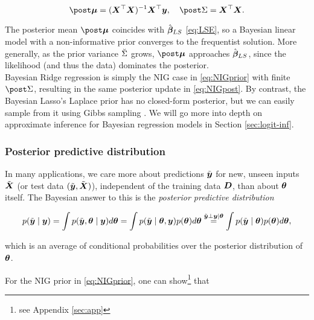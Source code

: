 \begin{equation*}
        \mupo = (\bX^\top \bX)^{-1} \bX^\top \by, \quad
        \Sdpo = \bX^\top \bX.
\end{equation*}

The posterior mean $\mupo$ coincides with $\hat{\bm{\beta}}_{LS}$ \eqref{eq:LSE}, so a Bayesian linear model with a non-informative prior converges to the frequentist solution.
More generally, as the prior variance $\breve{\Sigma}$ grows, $\mupo$ approaches $\hat{\bm{\beta}}_{LS}$, since the likelihood (and thus the data) dominates the posterior.\\

Bayesian Ridge regression is simply the NIG case in \eqref{eq:NIGprior} with finite $\Sdpo$, resulting in the same posterior update in \eqref{eq:NIGpost}.
By contrast, the Bayesian Lasso's Laplace prior has no closed-form posterior, but we can easily sample from it using Gibbs sampling \citep{park_bayesian_2008}.
We will go more into depth on approximate inference for Bayesian regression models in Section \ref{sec:logit-inf}.

\subsubsection*{Posterior predictive distribution}
In many applications, we care more about predictions $\tilde{\bm{y}}$ for new, unseen inputs $\tilde{\bm{X}}$ (or test data $(\tilde{\bm{y}}, \tilde{\bm{X}})$), independent of the training data $\bm{D}$, than about $\bm{\theta}$ itself.
The Bayesian answer to this is the \textit{posterior predictive distribution} 

\begin{equation*}
    p(\tilde{\bm{y}} \mid \bm{y}) = \int p(\tilde{\bm{y}}, \bm{\theta} \mid \bm{y}) d \bm{\theta} 
    = \int p(\tilde{\bm{y}} \mid \bm{\theta}, \bm{y}) p(\bm{\theta}) d \bm{\theta}
    \overset{\tilde{\bm{y}} \perp \bm{y} \mid \bm{\theta}}{=}  \int p(\tilde{\bm{y}} \mid \bm{\theta}) p(\bm{\theta}) d \bm{\theta},
\end{equation*}

which is an average of conditional probabilities over the posterior distribution of $\bm{\theta}$.\footnotemark


For the NIG prior in \eqref{eq:NIGprior}, one can show\footnote{see Appendix \ref{sec:app}} that

